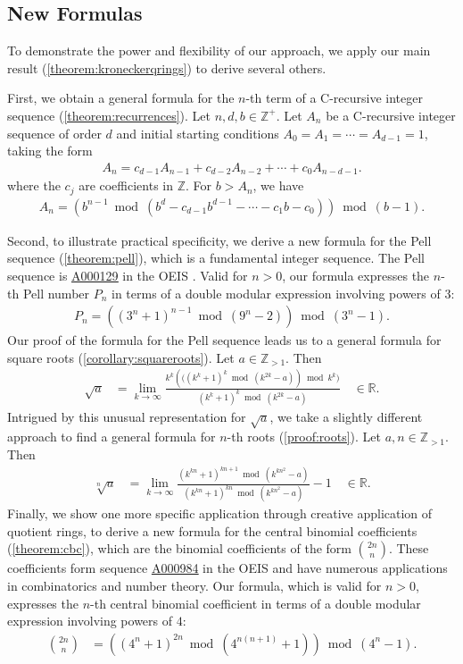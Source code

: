 \documentclass[12pt]{article}
\theoremstyle{plain}
\theoremstyle{definition}
\newcommand{\seqnum}[1]{\href{https://oeis.org/#1}{\rm \underline{#1}}}
\begin{document}
\subsection{New Formulas}
To demonstrate the power and flexibility of our approach, we apply our main result (\cref{theorem:kroneckerqrings}) to derive several others.

First, we obtain a general formula for the $n$-th term of a C-recursive integer sequence (\cref{theorem:recurrences}). Let $n,d,b \in \mathbb{Z}^+$. Let $A_n$ be a C-recursive integer sequence of order $d$ and initial starting conditions $A_0=A_1=\cdots=A_{d-1}=1$, taking the form
\begin{align*}
    A_{n} = c_{d-1} A_{n-1} + c_{d-2} A_{n-2} + \cdots + c_{0} A_{n-d-1} .
\end{align*}
where the $c_j$ are coefficients in $\mathbb{Z}$. For $b > A_n$, we have
\begin{align*}
    A_{n} = \left( b^{n-1} \bmod{(b^d - c_{d-1} b^{d-1} - \cdots -  c_1 b - c_0 )} \right) \bmod{(b-1)} .
\end{align*}

Second, to illustrate practical specificity, we derive a new formula for the Pell sequence (\cref{theorem:pell}), which is a fundamental integer sequence. The Pell sequence is \seqnum{A000129} in the OEIS \cite{A000129}. Valid for $n > 0$, our formula expresses the $n$-th Pell number $P_n$ in terms of a double modular expression involving powers of $3$:
\begin{align*}
    P_n = \left((3^{n}+1)^{n-1} \bmod{(9^n-2)}\right) \bmod{(3^n-1)} .
\end{align*}
Our proof of the formula for the Pell sequence leads us to a general formula for square roots (\cref{corollary:squareroots}). Let $a \in \mathbb{Z}_{>1}$. Then
\begin{align*}
\sqrt{a} &= \lim_{k\rightarrow\infty}
    \frac{k^k \left(((k^k + 1)^k \bmod{(k^{2k}-a)}\right) \bmod{k^k})}
        {(k^k + 1)^k \bmod{(k^{2k}-a)}} \quad \in \mathbb{R} .
\end{align*}
Intrigued by this unusual representation for $\sqrt{a}$, we take a slightly different approach to find a general formula for $n$-th roots (\cref{proof:roots}). Let $a,n \in \mathbb{Z}_{>1}$. Then
\begin{align*}
\sqrt[n]{a} &= \lim_{k\rightarrow\infty}
    \frac{(k^{kn} + 1)^{kn+1} \bmod{(k^{kn^2}-a)}}
    {(k^{kn} + 1)^{kn} \bmod{ (k^{kn^2}-a)}} - 1  \quad \in \mathbb{R} .
\end{align*}
Finally, we show one more specific application through creative application of quotient rings, to derive a new formula for the central binomial coefficients (\cref{theorem:cbc}), which are the binomial coefficients of the form $\binom{2n}{n}$. These coefficients form sequence \seqnum{A000984} in the OEIS \cite{A000984} and have numerous applications in combinatorics and number theory. Our formula, which is valid for $n > 0$, expresses the $n$-th central binomial coefficient in terms of a double modular expression involving powers of $4$:
\begin{align*}
    \binom{2n}{n} &= \left((4^n + 1)^{2n} \bmod{(4^{n(n+1)} + 1)}\right) \bmod{(4^n-1)} .
\end{align*}
\end{document}
